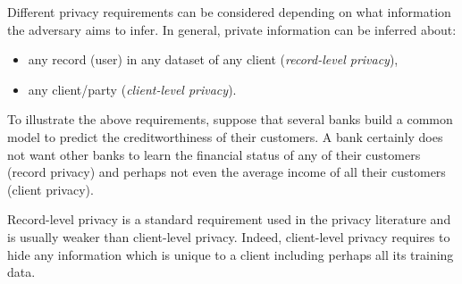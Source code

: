 \documentclass[accepted]{uai2021} %
\newcommand{\todo}[1]{{\color{red}{\textbf{TODO:}  #1}}}
\begin{document}
Different privacy requirements can be considered depending on what information the adversary aims to infer. In general, private information can be inferred about:
\begin{itemize}
    \item any record (user) in any dataset of any client (\emph{record-level privacy}),
    \item any client/party (\emph{client-level privacy}).
\end{itemize}

To illustrate the above requirements, suppose that several banks build a common model to predict the creditworthiness of their customers. A bank certainly does not want other banks to learn the financial status of any of their customers (record privacy) and perhaps not even the average income of all their customers  (client privacy).

Record-level privacy is a standard requirement used in the privacy literature and is usually weaker than client-level privacy. Indeed, client-level privacy requires to hide any information which is unique to a client including perhaps all its training data.   

\end{document}
